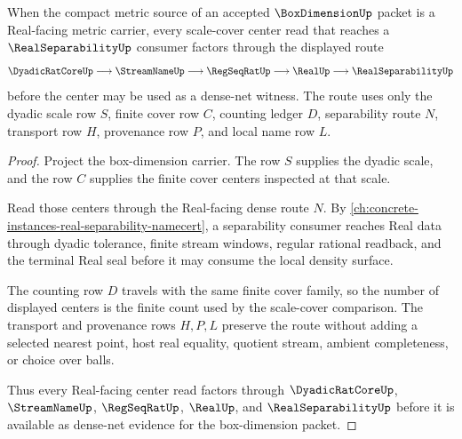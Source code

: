 \begin{theorem}
\label{thm:box-dimension-real-separability-net-route}
When the compact metric source of an accepted $\BoxDimensionUp$ packet is a Real-facing metric carrier, every scale-cover center read that reaches a $\RealSeparabilityUp$ consumer factors through the displayed route
$$
\DyadicRatCoreUp \longrightarrow \StreamNameUp \longrightarrow \RegSeqRatUp \longrightarrow \RealUp \longrightarrow \RealSeparabilityUp
$$
before the center may be used as a dense-net witness. The route uses only the dyadic scale row $S$, finite cover row $C$, counting ledger $D$, separability route $N$, transport row $H$, provenance row $P$, and local name row $L$.
\end{theorem}
\begin{proof}
Project the box-dimension carrier. The row $S$ supplies the dyadic scale, and the row $C$ supplies the finite cover centers inspected at that scale.

Read those centers through the Real-facing dense route $N$. By \autoref{ch:concrete-instances-real-separability-namecert}, a separability consumer reaches Real data through dyadic tolerance, finite stream windows, regular rational readback, and the terminal Real seal before it may consume the local density surface.

The counting row $D$ travels with the same finite cover family, so the number of displayed centers is the finite count used by the scale-cover comparison. The transport and provenance rows $H,P,L$ preserve the route without adding a selected nearest point, host real equality, quotient stream, ambient completeness, or choice over balls.

Thus every Real-facing center read factors through $\DyadicRatCoreUp$, $\StreamNameUp$, $\RegSeqRatUp$, $\RealUp$, and $\RealSeparabilityUp$ before it is available as dense-net evidence for the box-dimension packet.
\end{proof}

\begin{closurestatus}{\BoxDimensionUp}
  \theoryclosure{\seedClosure}
  \formalstatus{\unformalizedV}
\end{closurestatus}
